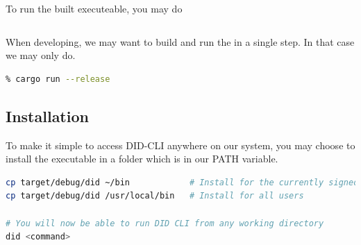 To run the built executeable, you may do

\begin{lstlisting}[language=bash]
% ./target/debug/did
\end{lstlisting}

When developing, we may want to build and run the in a single step. In
that case we may only do.

\begin{lstlisting}[language=bash]
% cargo run
% cargo run --release
\end{lstlisting}

\hypertarget{installation}{%
\subsection{Installation}\label{installation}}

To make it simple to access DID-CLI anywhere on our system, you may
choose to install the executable in a folder which is in our PATH
variable.

\begin{lstlisting}[language=bash]
cp target/debug/did ~/bin            # Install for the currently signed in user
cp target/debug/did /usr/local/bin   # Install for all users

# You will now be able to run DID CLI from any working directory
did <command>
\end{lstlisting}
